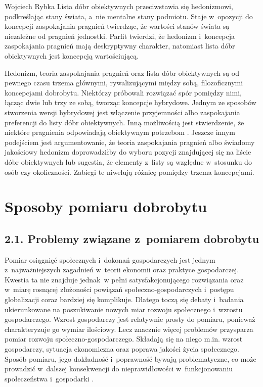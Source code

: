 \begin{artplenv}{Wojciech Rybka}
Lista dóbr obiektywnych przeciwstawia się hedonizmowi, podkreślając stany świata, a~nie mentalne stany podmiotu.
Staje w~opozycji do koncepcji zaspokajania pragnień twierdząc, że wartości stanów świata są niezależne od pragnień jednostki.
Parfit
\parencite*{parfit_racje_2012}
twierdzi, że hedonizm i~koncepcja zaspokajania pragnień mają deskryptywny
charakter, natomiast lista dóbr obiektywnych jest koncepcją wartościującą.

\enlargethispage{1\baselineskip}

Hedonizm, teoria zaspokajania pragnień oraz lista dóbr obiektywnych są od pewnego czasu trzema głównymi, rywalizującymi
między sobą, filozoficznymi koncepcjami dobrobytu. Niektórzy próbowali rozwiązać spór pomiędzy nimi, łącząc dwie lub
trzy ze sobą, tworząc koncepcje hybrydowe. Jednym ze sposobów stworzenia wersji hybrydowej jest włączenie przyjemności
albo zaspokajania preferencji do listy dóbr obiektywnych. Inną możliwością jest stwierdzenie, że niektóre pragnienia
odpowiadają obiektywnym potrzebom
\parencite{hamilton_political_2003}.
Jeszcze innym podejściem jest
argumentowanie, że teoria zaspokajania pragnień albo świadomy jakościowy hedonizm doprowadziłby do wyboru pozycji
znajdującej się na liście dóbr obiektywnych lub sugestia, że elementy z~listy są względne w~stosunku do osób czy
okoliczności. Zabiegi te niwelują różnicę pomiędzy trzema koncepcjami.

\section{Sposoby pomiaru dobrobytu}
\baselineskip
\subsection{2.1. Problemy związane z~pomiarem dobrobytu}
Pomiar osiągnięć społecznych i~dokonań gospodarczych jest jednym z~najważniejszych zagadnień w~teorii ekonomii oraz
praktyce gospodarczej. Kwestia ta nie znajduje jednak~w pełni satysfakcjonującego rozwiązania oraz w~miarę rosnącej
złożoności powiązań społeczno-gospodarczych i~postępu globalizacji coraz bardziej się komplikuje. Dlatego toczą się
debaty  i~badania ukierunkowane na poszukiwanie nowych miar rozwoju społecznego i~wzrostu gospodarczego. Wzrost
gospodarczy jest relatywnie prosty do pomiaru, ponieważ charakteryzuje go wymiar ilościowy. Lecz znacznie więcej
problemów przysparza pomiar rozwoju społeczno-gospodarczego. Składają się na niego m.in. wzrost gospodarczy, sytuacja
ekonomiczna oraz poprawa jakości życia społecznego. Sposób pomiaru, jego dokładność i~poprawność bywają problematyczne,
co może prowadzić w~dalszej konsekwencji do nieprawidłowości w~funkcjonowaniu społeczeństwa i~gospodarki
\parencite{cieslik_dylemat_2014}.


\end{artplenv}

